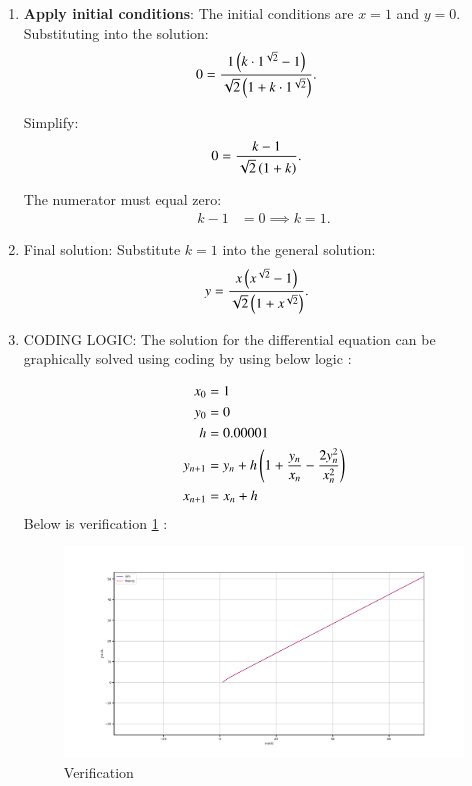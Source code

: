 \documentclass[journal]{IEEEtran}
\begin{document}
\begin{enumerate}
\item \textbf{Apply initial conditions}:  
The initial conditions are $x = 1$ and $y = 0$. Substituting into the solution:
\begin{align}
0 &= \frac{1 \left(k \cdot 1^{\sqrt{2}} - 1\right)}{\sqrt{2} \left(1 + k \cdot 1^{\sqrt{2}}\right)}.
\end{align}

Simplify:
\begin{align}
0 &= \frac{k - 1}{\sqrt{2} \left(1 + k\right)}.
\end{align}

The numerator must equal zero:
\begin{align}
k - 1 &= 0 \implies k = 1.
\end{align}

\item Final solution:  
Substitute $k = 1$ into the general solution:
\begin{align}
y &= \frac{x \left(x^{\sqrt{2}} - 1\right)}{\sqrt{2} \left(1 + x^{\sqrt{2}}\right)}.
\end{align}

\item CODING LOGIC: The solution for the differential equation can be graphically solved using coding by using below logic :

\begin{align} 
	x_0 &= 1 \\ 
	y_0 &= 0  \\
	h&=0.00001 \\
	y_{n+1} &= y_{n} + h\left(1 + \frac{y_n}{x_n} - \frac{2y_n^2}{x_n^2}\right) \\ 
	x_{n+1} &= x_{n} + h 
\end{align}
\newpage
Below is verification \ref{fig:example} :
\begin{figure}[h]  %
    \centering  %
    \includegraphics[width=\columnwidth]{figs/Figure_1.png}  
    \caption{Verification}
    \label{fig:example}  %
\end{figure}

\end{enumerate}
\end{document}
